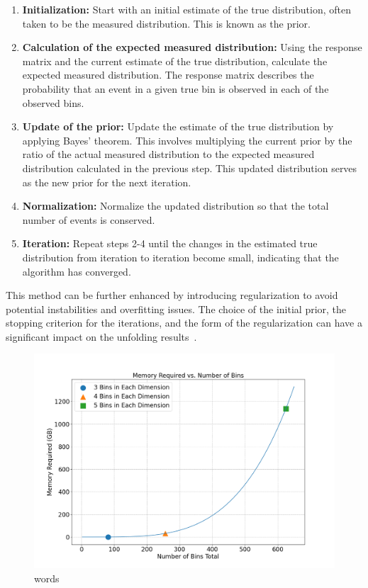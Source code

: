     \begin{enumerate}
        \item \textbf{Initialization:} Start with an initial estimate of the true distribution, often taken to be the measured distribution. This is known as the prior.
    
        \item \textbf{Calculation of the expected measured distribution:} Using the response matrix and the current estimate of the true distribution, calculate the expected measured distribution. The response matrix describes the probability that an event in a given true bin is observed in each of the observed bins.
    
        \item \textbf{Update of the prior:} Update the estimate of the true distribution by applying Bayes' theorem. This involves multiplying the current prior by the ratio of the actual measured distribution to the expected measured distribution calculated in the previous step. This updated distribution serves as the new prior for the next iteration.
    
        \item \textbf{Normalization:} Normalize the updated distribution so that the total number of events is conserved.
    
        \item \textbf{Iteration:} Repeat steps 2-4 until the changes in the estimated true distribution from iteration to iteration become small, indicating that the algorithm has converged.
    \end{enumerate}
    
    This method can be further enhanced by introducing regularization to avoid potential instabilities and overfitting issues. The choice of the initial prior, the stopping criterion for the iterations, and the form of the regularization can have a significant impact on the unfolding results~\cite{dagostini1995probability}.
    
    
    \begin{figure}[ht]
    \centering
    \includegraphics[trim={0 0 0 0},clip,width=\textwidth]{Chapters/Ch5-Further/0_IBU/pics/memory_required_vs_number_of_bins_in_each_dim.png}
    \caption[words]{words}
    \label{fig:ibu10}
    \end{figure}
    
